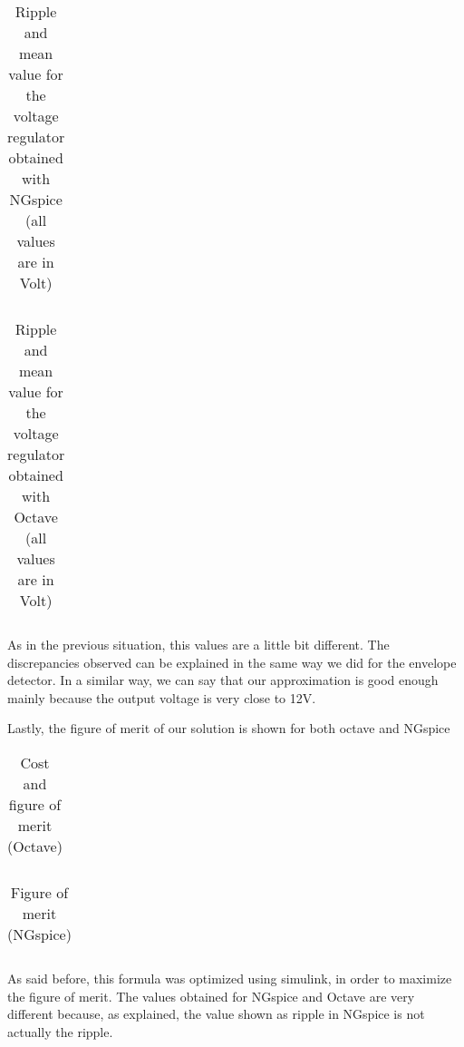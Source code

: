 \vspace{5mm}
\begin{table}[h!]
\centering
\begin{tabularx}{0.9\textwidth} {
  | >{\raggedright\arraybackslash}X
  | >{\raggedleft\arraybackslash}X | }
 \hline

\end{tabularx}
\caption{\label{tab:Table 8} Ripple and mean value for the voltage regulator obtained with NGspice (all values are in Volt)}
\end{table}
\vspace{5mm}

\begin{table}[h!]
\centering
\begin{tabularx}{0.9\textwidth} {
  | >{\raggedright\arraybackslash}X
  | >{\raggedleft\arraybackslash}X | }
 \hline

\end{tabularx}
\caption{\label{tab:Table 9} Ripple and mean value for the voltage regulator obtained with Octave (all values are in Volt)}
\end{table}
\vspace{5mm}

\par As in the previous situation, this values are a little bit different. The discrepancies observed can be explained in the same way we did for the envelope detector. In a similar way, we can say that our approximation is good enough mainly because the output voltage is very close to 12V.
\par Lastly, the figure of merit of our solution is shown for both octave and NGspice

\vspace{5mm}
\begin{table}[h!]
\centering
\begin{tabularx}{0.9\textwidth} {
  | >{\raggedright\arraybackslash}X
  | >{\raggedleft\arraybackslash}X | }
 \hline

\end{tabularx}
\caption{\label{tab:Table 10} Cost and figure of merit (Octave)}
\end{table}
\vspace{5mm}

\vspace{5mm}
\begin{table}[h!]
\centering
\begin{tabularx}{0.9\textwidth} {
  | >{\raggedright\arraybackslash}X
  | >{\raggedleft\arraybackslash}X | }
 \hline

\end{tabularx}
\caption{\label{tab:Table 11} Figure of merit (NGspice)}
\end{table}
\vspace{5mm}

\par As said before, this formula was optimized using simulink, in order to maximize the figure of merit. The values obtained for NGspice and Octave are very different because, as explained, the value shown as ripple in NGspice is not actually the ripple.
